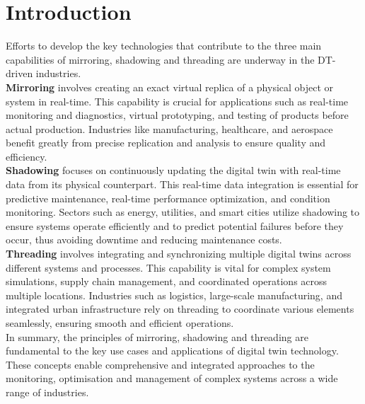 \section{Introduction}

Efforts to develop the key technologies that contribute to the 
three main capabilities of mirroring,
shadowing and threading are underway in the DT-driven industries.\cite{jiang2021industrial}
\\ \textbf{Mirroring} involves creating an exact virtual replica of a physical object or system in real-time. This capability is crucial for applications such as real-time monitoring and diagnostics, virtual prototyping, and testing of products before actual production. Industries like manufacturing, healthcare, and aerospace benefit greatly from precise replication and analysis to ensure quality and efficiency.
\\ \textbf{Shadowing} focuses on continuously updating the digital twin with real-time data from its physical counterpart. This real-time data integration is essential for predictive maintenance, real-time performance optimization, and condition monitoring. Sectors such as energy, utilities, and smart cities utilize shadowing to ensure systems operate efficiently and to predict potential failures before they occur, thus avoiding downtime and reducing maintenance costs.\cite{jiang2021industrial}
\\ \textbf{Threading} involves integrating and synchronizing multiple digital twins across different systems and processes. This capability is vital for complex system simulations, supply chain management, and coordinated operations across multiple locations. Industries such as logistics, large-scale manufacturing, and integrated urban infrastructure rely on threading to coordinate various elements seamlessly, ensuring smooth and efficient operations.\cite{jiang2021industrial}
\\ In summary, the principles of mirroring, shadowing and threading are fundamental to the key use cases and applications of digital twin technology. These concepts enable comprehensive and integrated approaches to the monitoring, optimisation and management of complex systems across a wide range of industries.